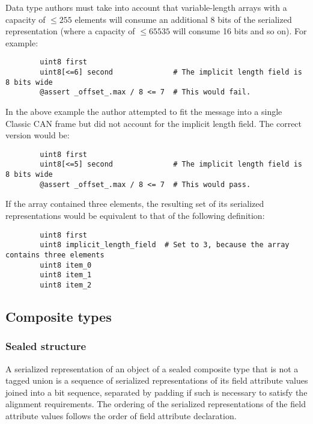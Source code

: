 \begin{remark}
    Data type authors must take into account that variable-length arrays with a capacity of $\leq{}255$ elements will
    consume an additional 8 bits of the serialized representation
    (where a capacity of $\leq 65535$ will consume 16 bits and so on).
    For example:

    \begin{verbatim}
        uint8 first
        uint8[<=6] second              # The implicit length field is 8 bits wide
        @assert _offset_.max / 8 <= 7  # This would fail.
    \end{verbatim}

    In the above example the author attempted to fit the message into a single Classic CAN frame but
    did not account for the implicit length field. The correct version would be:

    \begin{verbatim}
        uint8 first
        uint8[<=5] second              # The implicit length field is 8 bits wide
        @assert _offset_.max / 8 <= 7  # This would pass.
    \end{verbatim}

    If the array contained three elements, the resulting set of its serialized representations would
    be equivalent to that of the following definition:

    \begin{verbatim}
        uint8 first
        uint8 implicit_length_field  # Set to 3, because the array contains three elements
        uint8 item_0
        uint8 item_1
        uint8 item_2
    \end{verbatim}
\end{remark}

\subsection{Composite types}\label{sec:dsdl_serialization_composite}

\subsubsection{Sealed structure}

A serialized representation of an object of a sealed composite type that is not a tagged union
is a sequence of serialized representations of its field attribute values joined into a bit sequence,
separated by padding if such is necessary to satisfy the alignment requirements.
The ordering of the serialized representations of the field attribute values follows the order
of field attribute declaration.

